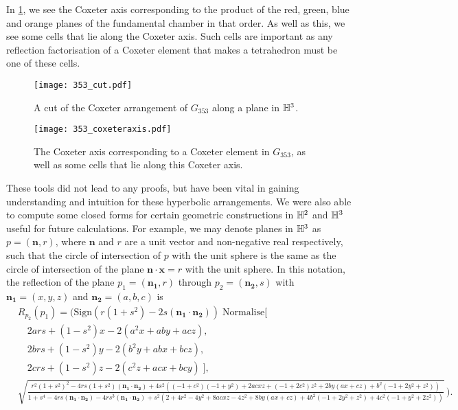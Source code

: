 In \cref{fig:353_coxeter_axis}, we see the Coxeter axis corresponding to the product of the red, green, blue and orange planes of the fundamental chamber in that order.
As well as this, we see some cells that lie along the Coxeter axis.
Such cells are important as any reflection factorisation of a Coxeter element that makes a tetrahedron must be one of these cells.

\begin{figure}
	\centering
	\begin{minipage}{.5\textwidth}
		\centering
		\texttt{[image: 353\_cut.pdf]}
		\caption{A cut of the Coxeter arrangement of $G_{353}$ along a plane in $\mathbb{H}^3$.}
		\label{fig:353_cut}
	\end{minipage}%
	\begin{minipage}{.5\textwidth}
		\centering
		\texttt{[image: 353\_coxeteraxis.pdf]}
		\caption{The Coxeter axis corresponding to a Coxeter element in $G_{353}$, as well as some cells that lie along this Coxeter axis.}
		\label{fig:353_coxeter_axis}
	\end{minipage}
\end{figure}

These tools did not lead to any proofs, but have been vital in gaining understanding and intuition for these hyperbolic arrangements.
We were also able to compute some closed forms for certain geometric constructions in $\mathbb{H}^2$ and  $\mathbb{H}^3$ useful for future calculations.
For example, we may denote planes in $\mathbb{H}^3$ as $p = (\mathbf{n},r)$, where $\mathbf{n}$ and $r$ are a unit vector and non-negative real respectively, such that the circle of intersection of $p$ with the unit sphere is the same as the circle of intersection of the plane $\mathbf{n} \cdot \mathbf{x} = r$ with the unit sphere.
In this notation, the reflection of the plane $p_1 =(\mathbf{n_1},r)$ through $p_2 = (\mathbf{n_2},s)$ with $\mathbf{n_1}=(x,y,z)$ and  $\mathbf{n_2}=(a,b,c)$ is
\begin{align*}
	 & {\scriptscriptstyle R_{p_2}(p_1) =\bigg(\text{Sign}\left(r(1+s^2)-2s(\mathbf{n_1}\cdot\mathbf{n_2})\right)\; \text{Normalise}\big[}                      \\
	 & {\scriptscriptstyle\quad 2ars + (1-s^2)x-2(a^2x+aby+acz),                                                                                             }  \\
	 & {\scriptscriptstyle\quad 2brs + (1-s^2)y-2(b^2y+abx+bcz),                                                                                             }  \\
	 & {\scriptscriptstyle\quad 2crs + (1-s^2)z-2(c^2z+acx+bcy) \;\big],                                                                                      } \\
	 & {\scriptscriptstyle\sqrt{\frac{r^2 (1 + s^2)^2 - 4 r s (1 + s^2) (\mathbf{n_1}\cdot\mathbf{n_2}) +
					4 s^2 ((-1 + c^2) (-1 + y^2) + 2 a c x z + (-1 + 2 c^2) z^2 +
					2 b y (a x + c z) + b^2 (-1 + 2 y^2 + z^2))}{1 + s^4 -
					4 r s (\mathbf{n_1}\cdot\mathbf{n_2}) - 4 r s^3 (\mathbf{n_1}\cdot\mathbf{n_2}) +
					s^2 (2 + 4 r^2 - 4 y^2 + 8 a c x z - 4 z^2 + 8 b y (a x + c z) +
					4 b^2 (-1 + 2 y^2 + z^2) + 4 c^2 (-1 + y^2 + 2 z^2))}}\,\bigg)}.
\end{align*}


